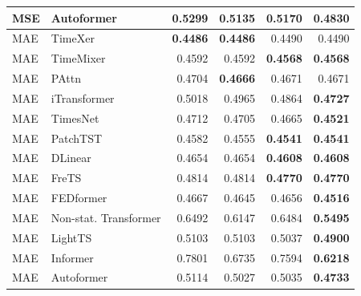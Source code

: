 \begin{longtable}{llrrrr}
MSE & Autoformer & 0.5299 & 0.5135 & 0.5170 & \textbf{0.4830} \\
\midrule
MAE & TimeXer & \textbf{0.4486} & \textbf{0.4486} & 0.4490 & 0.4490 \\
MAE & TimeMixer & 0.4592 & 0.4592 & \textbf{0.4568} & \textbf{0.4568} \\
MAE & PAttn & 0.4704 & \textbf{0.4666} & 0.4671 & 0.4671 \\
MAE & iTransformer & 0.5018 & 0.4965 & 0.4864 & \textbf{0.4727} \\
MAE & TimesNet & 0.4712 & 0.4705 & 0.4665 & \textbf{0.4521} \\
MAE & PatchTST & 0.4582 & 0.4555 & \textbf{0.4541} & \textbf{0.4541} \\
MAE & DLinear & 0.4654 & 0.4654 & \textbf{0.4608} & \textbf{0.4608} \\
MAE & FreTS & 0.4814 & 0.4814 & \textbf{0.4770} & \textbf{0.4770} \\
MAE & FEDformer & 0.4667 & 0.4645 & 0.4656 & \textbf{0.4516} \\
MAE & Non-stat. Transformer & 0.6492 & 0.6147 & 0.6484 & \textbf{0.5495} \\
MAE & LightTS & 0.5103 & 0.5103 & 0.5037 & \textbf{0.4900} \\
MAE & Informer & 0.7801 & 0.6735 & 0.7594 & \textbf{0.6218} \\
MAE & Autoformer & 0.5114 & 0.5027 & 0.5035 & \textbf{0.4733} \\
\end{longtable}
\endgroup


